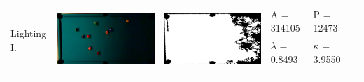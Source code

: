 \begin{tabular}{|l|c|c|l|l|c|}
\multirow{4}{*}{Lighting I.} & \multirow{4}{*}{\includegraphics[scale=0.1]{../images/1/7_img.png}} & \multirow{4}{*}{\includegraphics[scale=0.1]{../images/1/7_mask.png}} & A = 314105 & P = 12473 & \multirow{4}{*}{}\\ 
& & & $\lambda$ = 0.8493 & $\kappa$ = 3.9550 & \\
&&&&&\\
&&&&&\\
\hline


\end{tabular}
